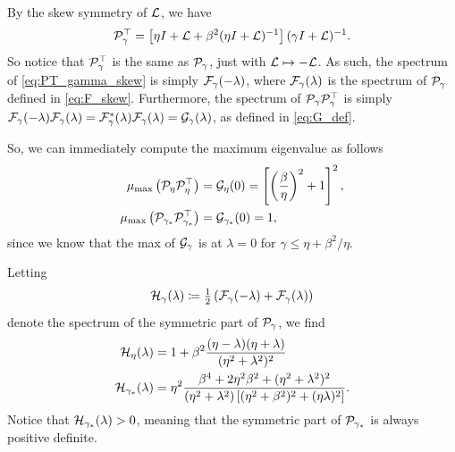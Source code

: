 \documentclass[a4paper,10pt]{article}
\begin{document}
{\begin{itemize}
By the skew symmetry of ${\cal L}$, we have
\begin{align}
\label{eq:PT_gamma_skew}
{\cal P}_{\gamma}^\top = \left[ \eta I + {\cal L} +  \beta^2 (\eta I + {\cal L})^{-1} \right] (\gamma I + {\cal L})^{-1}.
\end{align}
So notice that ${\cal P}_{\gamma}^\top$ is the same as ${\cal P}_{\gamma}$, just with ${\cal L} \mapsto - {\cal L}$. As such, the spectrum of \eqref{eq:PT_gamma_skew} is simply ${\cal F}_{\gamma}(- \lambda)$, where ${\cal F}_{\gamma}(\lambda)$ is the spectrum of ${\cal P}_{\gamma}$ defined in \eqref{eq:F_skew}. Furthermore, the spectrum of ${\cal P}_{\gamma} {\cal P}_{\gamma}^\top $ is simply ${\cal F}_{\gamma}(- \lambda) {\cal F}_{\gamma}(\lambda) = {\cal F}_{\gamma}^*(\lambda) {\cal F}_{\gamma}(\lambda) = {\cal G}_{\gamma}(\lambda)$, as defined in \eqref{eq:G_def}.

So, we can immediately compute the maximum eigenvalue as follows
\begin{equation}
\begin{aligned}
\label{eq:mu_skew}
\mu_{\max} \left( {\cal P}_{\eta} {\cal P}_{\eta}^\top \right) 
&= {\cal G}_{\eta}(0)
= 
\left[ \left(\frac{\beta}{\eta}\right)^2 +1 \right]^2, 
\\
\mu_{\max} \left( {\cal P}_{\gamma_*} {\cal P}_{\gamma_*}^\top \right) 
&= {\cal G}_{\gamma_*}(0) 
= 
1,
\end{aligned}
\end{equation}
since we know that the max of ${\cal G}_{\gamma}$ is at $\lambda = 0$ for $\gamma \leq \eta + \beta^2 / \eta$. 

Letting
\begin{align*}
{\cal H}_{\gamma}(\lambda) \coloneqq \tfrac{1}{2} \left( {\cal F}_{\gamma}(- \lambda) + {\cal F}_{\gamma}(\lambda) \right)
\end{align*}
denote the spectrum of the symmetric part of ${\cal P}_{\gamma}$, we find
\begin{align*}
{\cal H}_{\eta}(\lambda) 
&= 
1 + \beta^2 \frac{(\eta - \lambda)(\eta + \lambda)}{(\eta^2 + \lambda^2)^2}
\\
{\cal H}_{\gamma_*}(\lambda) 
&= 
\eta^2 \frac{\beta^4 + 2 \eta^2 \beta^2 +  (\eta^2 + \lambda^2)^2}{(\eta^2 + \lambda^2) \left[ (\eta^2 + \beta^2)^2 + (\eta \lambda)^2 \right]}.
\end{align*}
Notice that ${\cal H}_{\gamma_*}(\lambda) > 0$, meaning that the symmetric part of ${\cal P}_{\gamma_*}$ is always positive definite.


\end{itemize}}
\end{document}
